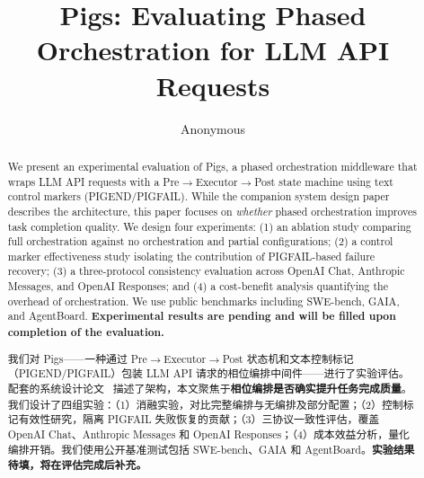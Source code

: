 \documentclass[10pt]{article}
\title{Pigs: Evaluating Phased Orchestration for LLM API Requests}
\author{Anonymous}
\date{}
\begin{document}
\maketitle

\begin{abstract}
We present an experimental evaluation of Pigs, a phased orchestration middleware that wraps LLM API requests with a Pre$\rightarrow$Executor$\rightarrow$Post state machine using text control markers (PIGEND/PIGFAIL). While the companion system design paper~\citep{pigs_system_design} describes the architecture, this paper focuses on \emph{whether} phased orchestration improves task completion quality. We design four experiments: (1) an ablation study comparing full orchestration against no orchestration and partial configurations; (2) a control marker effectiveness study isolating the contribution of PIGFAIL-based failure recovery; (3) a three-protocol consistency evaluation across OpenAI Chat, Anthropic Messages, and OpenAI Responses; and (4) a cost-benefit analysis quantifying the overhead of orchestration. We use public benchmarks including SWE-bench, GAIA, and AgentBoard. \textbf{Experimental results are pending and will be filled upon completion of the evaluation.}
\begin{chinese}
我们对 Pigs——一种通过 Pre$\rightarrow$Executor$\rightarrow$Post 状态机和文本控制标记（PIGEND/PIGFAIL）包装 LLM API 请求的相位编排中间件——进行了实验评估。配套的系统设计论文~\citep{pigs_system_design} 描述了架构，本文聚焦于\textbf{相位编排是否确实提升任务完成质量}。我们设计了四组实验：（1）消融实验，对比完整编排与无编排及部分配置；（2）控制标记有效性研究，隔离 PIGFAIL 失败恢复的贡献；（3）三协议一致性评估，覆盖 OpenAI Chat、Anthropic Messages 和 OpenAI Responses；（4）成本效益分析，量化编排开销。我们使用公开基准测试包括 SWE-bench、GAIA 和 AgentBoard。\textbf{实验结果待填，将在评估完成后补充。}
\end{chinese}
\end{abstract}










\end{document}
